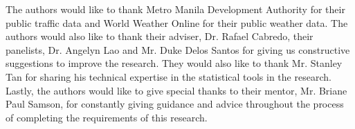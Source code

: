 \begin{acknowledgements}

The authors would like to thank Metro Manila Development Authority for their public traffic data and World Weather Online for their public weather data. The authors would also like to thank their adviser, Dr. Rafael Cabredo, their panelists, Dr. Angelyn Lao and Mr. Duke Delos Santos for giving us constructive suggestions to improve the research. They would also like to thank Mr. Stanley Tan for sharing his technical expertise in the statistical tools in the research. Lastly, the authors would like to give special thanks to their mentor, Mr. Briane Paul Samson, for constantly giving guidance and advice throughout the process of completing the requirements of this research.

\end{acknowledgements}